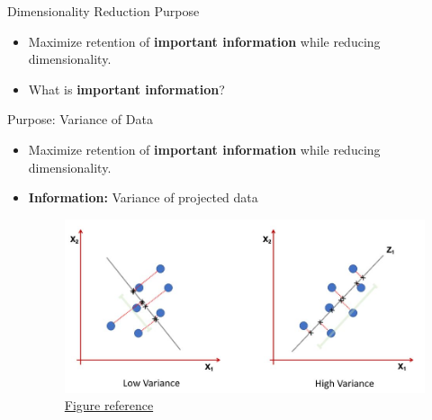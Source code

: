 \documentclass[serif, aspectratio=169]{beamer}
\begin{document}
\begin{frame}{Dimensionality Reduction Purpose}
    \begin{itemize}
        \item Maximize retention of  \textbf{important information} while reducing dimensionality.
        
        \item What is \textbf{important information}?
    \end{itemize}
\end{frame}

\begin{frame}{Purpose: Variance of Data}
    \begin{itemize}
        \item Maximize retention of  \textbf{important information} while reducing dimensionality.
        \item \textbf{Information:} Variance of projected data
        \begin{figure}[htpb]
                \begin{center}
                    \includegraphics[keepaspectratio, scale=0.5]{pic/dim_red_var.JPG}
                    \caption{\href{https://bookdown.org/tpinto_home/Unsupervised-learning/principal-components-analysis.html}{Figure reference}}
                \end{center}
        \end{figure}
    \end{itemize}

\end{frame}
\end{document}
